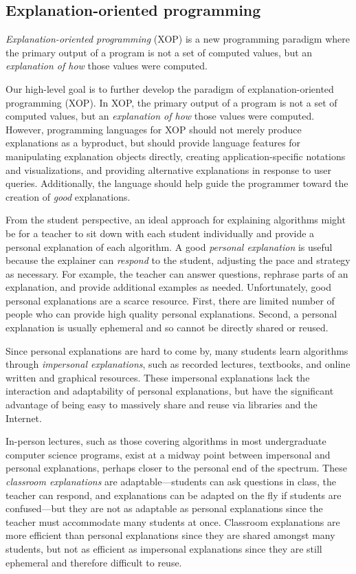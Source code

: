 \documentclass[conference]{IEEEtran}
\begin{document}
\subsection{Explanation-oriented programming}
\label{sec:back:xop}

\emph{Explanation-oriented programming} (XOP) is a new programming paradigm
where the primary output of a program is not a set of computed values, but an
\emph{explanation of how} those values were computed. 


Our high-level goal is to further develop the paradigm of explanation-oriented
programming (XOP). In XOP, the primary output of a program is not a set of
computed values, but an \emph{explanation of how} those values were computed.
However, programming languages for XOP should not merely produce explanations
as a byproduct, but should provide language features for manipulating
explanation objects directly, creating application-specific notations and
visualizations, and providing alternative explanations in response to user
queries. Additionally, the language should help guide the programmer toward the
creation of \emph{good} explanations.


From the student perspective, an ideal approach for explaining algorithms might
be for a teacher to sit down with each student individually and provide a
personal explanation of each algorithm. A good \emph{personal explanation} is
useful because the explainer can \emph{respond} to the student, adjusting the
pace and strategy as necessary. For example, the teacher can answer questions,
rephrase parts of an explanation, and provide additional examples as needed.
%
Unfortunately, good personal explanations are a scarce resource. First, there
are limited number of people who can provide high quality personal
explanations. Second, a personal explanation is usually ephemeral and so cannot
be directly shared or reused.


Since personal explanations are hard to come by, many students learn algorithms
through \emph{impersonal explanations}, such as recorded lectures, textbooks,
and online written and graphical resources.
%
These impersonal explanations lack the interaction and adaptability of personal
explanations, but have the significant advantage of being easy to massively
share and reuse via libraries and the Internet.

In-person lectures, such as those covering algorithms in most undergraduate
computer science programs, exist at a midway point between impersonal and
personal explanations, perhaps closer to the personal end of the spectrum.
These \emph{classroom explanations} are adaptable---students can ask questions
in class, the teacher can respond, and explanations can be adapted on the fly
if students are confused---but they are not as adaptable as personal
explanations since the teacher must accommodate many students at once.
Classroom explanations are more efficient than personal explanations since they
are shared amongst many students, but not as efficient as impersonal
explanations since they are still ephemeral and therefore difficult to reuse.
\end{document}
